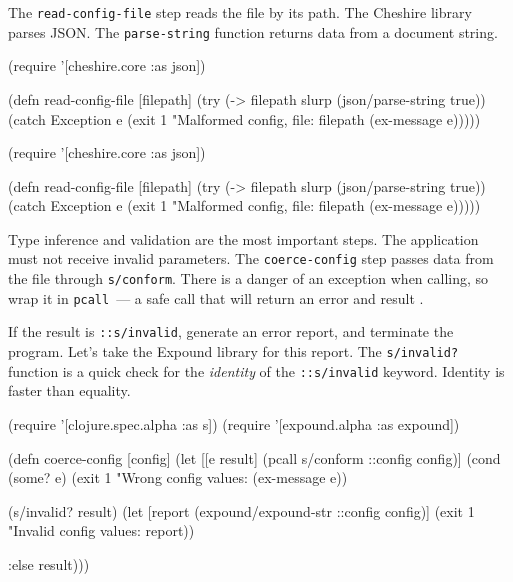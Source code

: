 \fi

The \verb|read-config-file| step reads the file by its path. The Cheshire library parses JSON. The \verb|parse-string| function returns data from a document string.


\ifx\DEVICETYPE\MOBILE

\begin{clojure}
(require '[cheshire.core :as json])

(defn read-config-file
  [filepath]
  (try
    (-> filepath
        slurp
        (json/parse-string true))
    (catch Exception e
      (exit 1
        "Malformed config,
                   file: %
            filepath (ex-message e)))))
\end{clojure}

\else

\begin{clojure}
(require '[cheshire.core :as json])

(defn read-config-file
  [filepath]
  (try
    (-> filepath slurp (json/parse-string true))
    (catch Exception e
      (exit 1 "Malformed config, file: %
            filepath (ex-message e)))))
\end{clojure}

\fi


Type inference and validation are the most important steps. The application must not receive invalid parameters. The \verb|coerce-config| step passes data from the file through \verb|s/conform|. There is a danger of an exception when calling, so wrap it in \verb|pcall|~--- a safe call that will return an error and result .

If the result is \verb|::s/invalid|, generate an error report, and terminate the program. Let's take the Expound library for this report. The \verb|s/invalid?| function is a quick check for the \emph{identity} of the \verb|::s/invalid| keyword. Identity is faster than equality.

\ifx\DEVICETYPE\MOBILE

\begin{clojure}
(require '[clojure.spec.alpha :as s])
(require '[expound.alpha :as expound])

(defn coerce-config [config]
  (let [[e result] (pcall s/conform
                     ::config config)]
    (cond
      (some? e)
      (exit 1 "Wrong config values: %
        (ex-message e))

      (s/invalid? result)
      (let [report (expound/expound-str
                     ::config config)]
        (exit 1
          "Invalid config values: %
          \newline report))

      :else result)))
\end{clojure}

